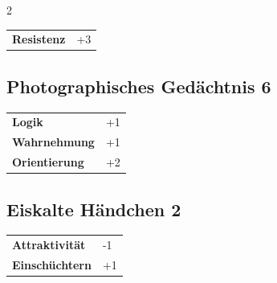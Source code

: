 \begin{multicols}{2}
\begin{tcolorbox}
\begin{tabular}{@{}ll@{}}
    \textbf{Resistenz} & +3\\
\end{tabular}


\end{tcolorbox}

\begin{tcolorbox}
    \subsection*{Photographisches Gedächtnis \hfill \small{6 }}
    \tcblower




\begin{tabular}{@{}ll@{}}
    \textbf{Logik} & +1\\
    \textbf{Wahrnehmung} & +1\\
    \textbf{Orientierung} & +2\\
\end{tabular}


\end{tcolorbox}

\begin{tcolorbox}
    \subsection*{Eiskalte Händchen \hfill \small{2 }}
    \tcblower




\begin{tabular}{@{}ll@{}}
    \textbf{Attraktivität} & -1\\
    \textbf{Einschüchtern} & +1\\
\end{tabular}


\end{tcolorbox}

\begin{tcolorbox}

\end{tcolorbox}
\end{multicols}
